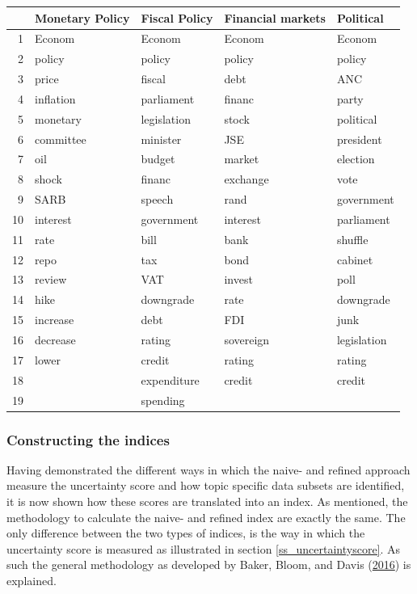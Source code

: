 \documentclass[11pt,preprint, authoryear]{elsarticle}
\let\origtable\table
\let\endorigtable\endtable
\renewenvironment{table}[1][2] {
    \expandafter\origtable\expandafter[H]
} {
    \endorigtable
}
\numberwithin{equation}{section}
\numberwithin{figure}{section}
\numberwithin{table}{section}
\begin{document}
\begin{table}[H]\footnotesize
\caption{Keywords per Index category \label{tbl_keywords}} 
\centering
\begin{tabular}{rllll}
  \hline
 & Monetary Policy & Fiscal Policy & Financial markets & Political \\ 
  \hline
1 & Econom & Econom & Econom & Econom \\ 
  2 & policy & policy & policy & policy \\ 
  3 & price & fiscal & debt & ANC \\ 
  4 & inflation & parliament & financ & party \\ 
  5 & monetary & legislation & stock & political \\ 
  6 & committee & minister & JSE & president \\ 
  7 & oil & budget & market & election \\ 
  8 & shock & financ & exchange & vote \\ 
  9 & SARB & speech & rand & government \\ 
  10 & interest & government & interest & parliament \\ 
  11 & rate & bill & bank & shuffle \\ 
  12 & repo & tax & bond & cabinet \\ 
  13 & review & VAT & invest & poll \\ 
  14 & hike & downgrade & rate & downgrade \\ 
  15 & increase & debt & FDI & junk \\ 
  16 & decrease & rating & sovereign & legislation \\ 
  17 & lower & credit & rating & rating \\ 
  18 &  & expenditure & credit & credit \\ 
  19 &  & spending &  &  \\ 
   \hline
\end{tabular}
\end{table}

\subsubsection{\texorpdfstring{Constructing the indices
\label{ss_indices}}{Constructing the indices }}\label{constructing-the-indices}

Having demonstrated the different ways in which the naive- and refined
approach measure the uncertainty score and how topic specific data
subsets are identified, it is now shown how these scores are translated
into an index. As mentioned, the methodology to calculate the naive- and
refined index are exactly the same. The only difference between the two
types of indices, is the way in which the uncertainty score is measured
as illustrated in section \ref{ss_uncertaintyscore}. As such the general
methodology as developed by Baker, Bloom, and Davis
(\protect\hyperlink{ref-Baker2016}{2016}) is explained.
\end{document}
